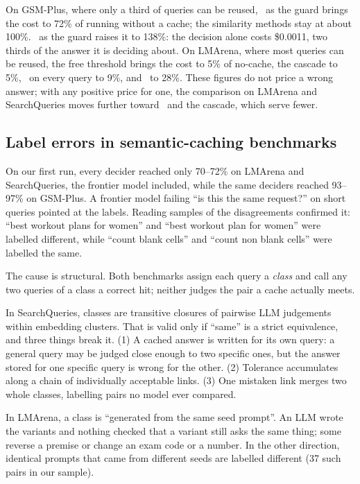On GSM-Plus, where only a third of queries can be reused, \jev\ as the guard brings the cost to 72\% of running without a cache; the similarity methods stay at about 100\%.
\gbig\ as the guard raises it to 138\%: the decision alone costs \$0.0011, two thirds of the answer it is deciding about.
On LMArena, where most queries can be reused, the free threshold brings the cost to 5\% of no-cache, the cascade to 5\%, \jev\ on every query to 9\%, and \gbig\ to 28\%.
These figures do not price a wrong answer; with any positive price for one, the comparison on LMArena and SearchQueries moves further toward \jev\ and the cascade, which serve fewer.

\subsection{Label errors in semantic-caching benchmarks}
\label{sec:labels}

On our first run, every decider reached only 70--72\% on LMArena and SearchQueries, the frontier model included, while the same deciders reached 93--97\% on GSM-Plus.
A frontier model failing ``is this the same request?'' on short queries pointed at the labels.
Reading samples of the disagreements confirmed it: ``best workout plans for women'' and ``best workout plan for women'' were labelled different, while ``count blank cells'' and ``count non blank cells'' were labelled the same.

The cause is structural.
Both benchmarks assign each query a \emph{class} and call any two queries of a class a correct hit; neither judges the pair a cache actually meets.

In SearchQueries, classes are transitive closures of pairwise LLM judgements within embedding clusters.
That is valid only if ``same'' is a strict equivalence, and three things break it.
(1) A cached answer is written for its own query: a general query may be judged close enough to two specific ones, but the answer stored for one specific query is wrong for the other.
(2) Tolerance accumulates along a chain of individually acceptable links.
(3) One mistaken link merges two whole classes, labelling pairs no model ever compared.

In LMArena, a class is ``generated from the same seed prompt''.
An LLM wrote the variants and nothing checked that a variant still asks the same thing; some reverse a premise or change an exam code or a number.
In the other direction, identical prompts that came from different seeds are labelled different (37 such pairs in our sample).

